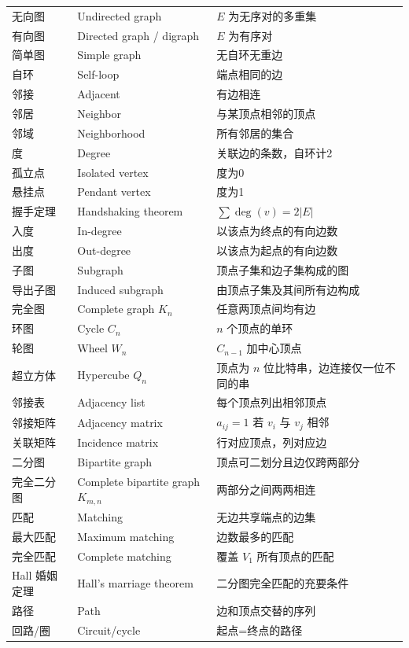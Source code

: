 \documentclass[UTF8,11pt,a4paper]{ctexbook}   %
\theoremstyle{definition}
\begin{document}
\begin{longtable}{|p{4.8cm}|p{4.8cm}|p{4.8cm}|}
无向图 & Undirected graph & $E$ 为无序对的多重集 \\
有向图 & Directed graph / digraph & $E$ 为有序对 \\
简单图 & Simple graph & 无自环无重边 \\
自环 & Self-loop & 端点相同的边 \\
邻接 & Adjacent & 有边相连 \\
邻居 & Neighbor & 与某顶点相邻的顶点 \\
邻域 & Neighborhood & 所有邻居的集合 \\
度 & Degree & 关联边的条数，自环计2 \\
孤立点 & Isolated vertex & 度为0 \\
悬挂点 & Pendant vertex & 度为1 \\
握手定理 & Handshaking theorem & $\sum \deg(v) = 2|E|$ \\
入度 & In-degree & 以该点为终点的有向边数 \\
出度 & Out-degree & 以该点为起点的有向边数 \\
子图 & Subgraph & 顶点子集和边子集构成的图 \\
导出子图 & Induced subgraph & 由顶点子集及其间所有边构成 \\
完全图 & Complete graph $K_n$ & 任意两顶点间均有边 \\
环图 & Cycle $C_n$ & $n$ 个顶点的单环 \\
轮图 & Wheel $W_n$ & $C_{n-1}$ 加中心顶点 \\
超立方体 & Hypercube $Q_n$ & 顶点为 $n$ 位比特串，边连接仅一位不同的串 \\
邻接表 & Adjacency list & 每个顶点列出相邻顶点 \\
邻接矩阵 & Adjacency matrix & $a_{ij}=1$ 若 $v_i$ 与 $v_j$ 相邻 \\
关联矩阵 & Incidence matrix & 行对应顶点，列对应边 \\
二分图 & Bipartite graph & 顶点可二划分且边仅跨两部分 \\
完全二分图 & Complete bipartite graph $K_{m,n}$ & 两部分之间两两相连 \\
匹配 & Matching & 无边共享端点的边集 \\
最大匹配 & Maximum matching & 边数最多的匹配 \\
完全匹配 & Complete matching & 覆盖 $V_1$ 所有顶点的匹配 \\
Hall 婚姻定理 & Hall's marriage theorem & 二分图完全匹配的充要条件 \\
路径 & Path & 边和顶点交替的序列 \\
回路/圈 & Circuit/cycle & 起点=终点的路径 \\

\end{longtable}
\end{document}
